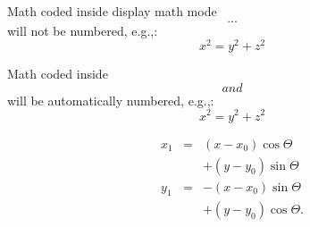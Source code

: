 
Math coded inside display math mode \[ ...\]
 will not be numbered, e.g.,:
 \[ x^2=y^2 + z^2\]

 Math coded inside \begin{equation} and \end{equation} will
 be automatically numbered, e.g.,:
 \begin{equation}
 x^2=y^2 + z^2
 \end{equation}


\begin{eqnarray}
  x_{1} & = & (x - x_{0}) \cos \Theta \nonumber \\
        && + (y - y_{0}) \sin \Theta  \nonumber \\
  y_{1} & = & -(x - x_{0}) \sin \Theta \nonumber \\
        && + (y - y_{0}) \cos \Theta.
\end{eqnarray}






%
%


%

